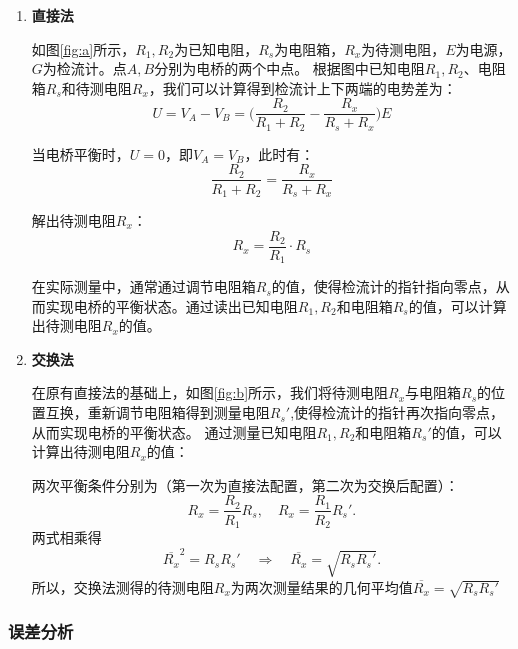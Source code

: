 \documentclass[]{../../templates/Report}%
\begin{document}
\begin{enumerate}[label=(\arabic*)]
\item \textbf{直接法}

如图\ref{fig:a}所示，$R_1,R_2$为已知电阻，$R_s$为电阻箱，$R_x$为待测电阻，$E$为电源，$G$为检流计。点$A,B$分别为电桥的两个中点。
根据图中已知电阻$R_1,R_2$、电阻箱$R_s$和待测电阻$R_x$，我们可以计算得到检流计上下两端的电势差为：
\begin{equation}
    U=V_A-V_B=\Big(\frac{R_2}{R_1+R_2}-\frac{R_x}{R_s+R_x}\Big)E
\end{equation}

当电桥平衡时，$U=0$，即$V_A=V_B$，此时有：
\begin{equation}
    \frac{R_2}{R_1+R_2}=\frac{R_x}{R_s+R_x}
\end{equation}

解出待测电阻$R_x$：
\begin{equation}
    R_x=\frac{R_2}{R_1}\cdot R_s
\end{equation}

在实际测量中，通常通过调节电阻箱$R_s$的值，使得检流计的指针指向零点，从而实现电桥的平衡状态。通过读出已知电阻$R_1,R_2$和电阻箱$R_s$的值，可以计算出待测电阻$R_x$的值。

\item \textbf{交换法}

在原有直接法的基础上，如图\ref{fig:b}所示，我们将待测电阻$R_x$与电阻箱$R_s$的位置互换，重新调节电阻箱得到测量电阻$R_s'$,使得检流计的指针再次指向零点，从而实现电桥的平衡状态。
通过测量已知电阻$R_1,R_2$和电阻箱$R_s'$的值，可以计算出待测电阻$R_x$的值：

两次平衡条件分别为（第一次为直接法配置，第二次为交换后配置）：
\begin{equation}
R_x=\frac{R_2}{R_1}R_s,\quad
R_x=\frac{R_1}{R_2}R_s'.
\end{equation}
两式相乘得
\begin{equation}
\overline{R_x}^2=R_sR_s'\quad\Rightarrow\quad \overline{R_x}=\sqrt{R_sR_s'}.
\end{equation}
所以，交换法测得的待测电阻$R_x$为两次测量结果的几何平均值$\overline{R_x}=\sqrt{R_sR_s'}$
\end{enumerate}

\subsubsection{误差分析}
\end{document}
